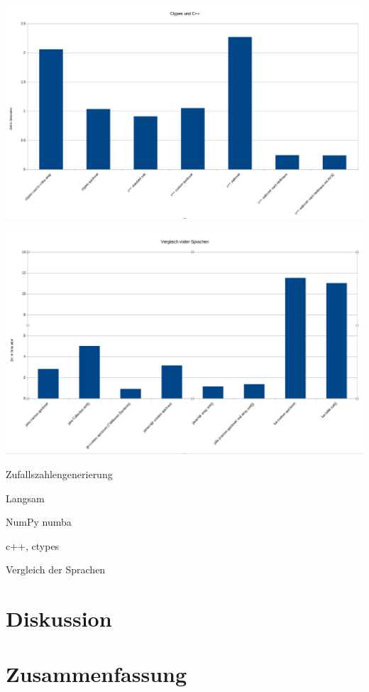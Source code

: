 \documentclass[12pt,a4paper]{article}
\begin{document}
\begin{center}
    \includegraphics[width=1\textwidth]{./diagramme/bilder/ctypescpp.png}
\end{center}

\begin{center}
    \includegraphics[width=1\textwidth]{./diagramme/bilder/comparison.png}
\end{center}

Zufallszahlengenerierung

Langsam

NumPy numba

c++, ctypes

Vergleich der Sprachen

\clearpage
\section{Diskussion}
\clearpage
\section{Zusammenfassung}

\clearpage

\printbibliography[title={Literaturverzeichnis}]
\end{document}
